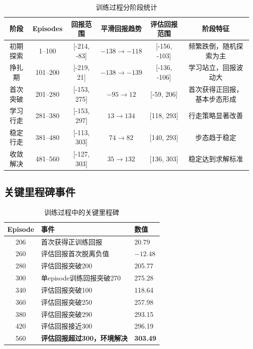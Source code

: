 \documentclass[UTF8,a4paper,12pt]{ctexart}
\begin{document}
\begin{table}[H]
\centering
\caption{训练过程分阶段统计}
\label{tab:phase}
\begin{tabular}{cccccc}
\toprule
\textbf{阶段} & \textbf{Episodes} & \textbf{回报范围} & \textbf{平滑回报趋势} & \textbf{评估回报范围} & \textbf{阶段特征} \\
\midrule
初期探索 & 1--100 & [-214, -83] & $-138 \to -118$ & [-156, -103] & 频繁跌倒，随机探索为主 \\
挣扎期 & 101--200 & [-219, 21] & $-138 \to -139$ & [-136, -106] & 学习站立，回报波动大 \\
首次突破 & 201--280 & [-153, 275] & $-95 \to 12$ & [-59, 206] & 首次获得正回报，基本步态形成 \\
学习行走 & 281--380 & [-153, 297] & $13 \to 134$ & [118, 293] & 行走策略显著改善 \\
稳定行走 & 381--480 & [-113, 303] & $74 \to 82$ & [140, 293] & 步态趋于稳定 \\
收敛解决 & 481--560 & [-127, 303] & $35 \to 132$ & [136, 303] & 稳定达到求解标准 \\
\bottomrule
\end{tabular}
\end{table}

\subsection{关键里程碑事件}

\begin{table}[H]
\centering
\caption{训练过程中的关键里程碑}
\label{tab:milestones}
\begin{tabular}{cll}
\toprule
\textbf{Episode} & \textbf{事件} & \textbf{数值} \\
\midrule
206 & 首次获得正训练回报 & 20.79 \\
260 & 评估回报首次脱离负值 & $-12.48$ \\
280 & 评估回报突破200 & 205.77 \\
300 & 单episode训练回报突破270 & 275.28 \\
340 & 评估回报突破100 & 118.64 \\
360 & 评估回报突破250 & 257.98 \\
380 & 评估回报突破290 & 293.15 \\
420 & 评估回报接近300 & 296.19 \\
560 & \textbf{评估回报超过300，环境解决} & \textbf{303.49} \\
\bottomrule
\end{tabular}
\end{table}
\end{document}
